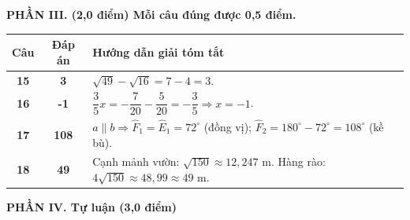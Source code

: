 \documentclass[11pt,a4paper]{article}
\begin{document}
\vspace{2.5mm}
\noindent\textbf{\large PHẦN III. (2,0 điểm) Mỗi câu đúng được 0,5 điểm.}
\vspace{1mm}

\noindent
\begin{tabularx}{\linewidth}{|c|c|X|}
\hline
\textbf{Câu} & \textbf{Đáp án} & \textbf{Hướng dẫn giải tóm tắt} \\ \hline
\textbf{15} & \textbf{3} & $\sqrt{49} - \sqrt{16} = 7 - 4 = 3$. \\ \hline
\textbf{16} & \textbf{-1} & $\dfrac{3}{5}x = -\dfrac{7}{20} - \dfrac{5}{20} = -\dfrac{3}{5} \Rightarrow x = -1$. \\ \hline
\textbf{17} & \textbf{108} & $a \parallel b \Rightarrow \widehat{F}_1 = \widehat{E}_1 = 72^\circ$ (đồng vị); $\widehat{F}_2 = 180^\circ - 72^\circ = 108^\circ$ (kề bù). \\ \hline
\textbf{18} & \textbf{49} & Cạnh mảnh vườn: $\sqrt{150} \approx 12,247\text{ m}$. Hàng rào: $4\sqrt{150} \approx 48,99 \approx 49\text{ m}$. \\ \hline
\end{tabularx}

\vspace{2.5mm}
\noindent\textbf{\large PHẦN IV. Tự luận (3,0 điểm)}
\vspace{1mm}
\end{document}
